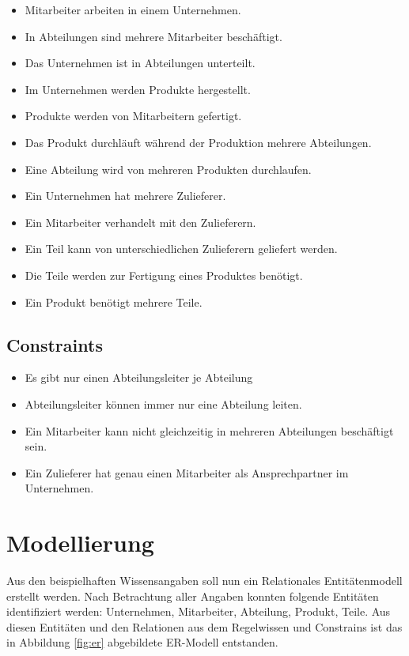 \documentclass[DIV=calc,paper=a4,fontsize=9pt,twocolumn]{scrartcl}
\begin{document}
\begin{itemize}
    \item Mitarbeiter arbeiten in einem Unternehmen.
    \item In Abteilungen sind mehrere Mitarbeiter beschäftigt.
    \item Das Unternehmen ist in Abteilungen unterteilt.
    \item Im Unternehmen werden Produkte hergestellt.
    \item Produkte werden von Mitarbeitern gefertigt.
    \item Das Produkt durchläuft während der Produktion mehrere Abteilungen.
    \item Eine Abteilung wird von mehreren Produkten durchlaufen.
    \item Ein Unternehmen hat mehrere Zulieferer.
    \item Ein Mitarbeiter verhandelt mit den Zulieferern.
    \item Ein Teil kann von unterschiedlichen Zulieferern geliefert werden.
    \item Die Teile werden zur Fertigung eines Produktes benötigt.
    \item Ein Produkt benötigt mehrere Teile.
\end{itemize}


\subsection{Constraints}

\begin{itemize}
\item Es gibt nur einen Abteilungsleiter je Abteilung
\item Abteilungsleiter können immer nur eine Abteilung leiten.
\item Ein Mitarbeiter kann nicht gleichzeitig in mehreren Abteilungen beschäftigt sein.
\item Ein Zulieferer hat genau einen Mitarbeiter als Ansprechpartner im Unternehmen.
\end{itemize}

\section{Modellierung}

Aus den beispielhaften Wissensangaben soll nun ein Relationales Entitätenmodell erstellt werden. Nach Betrachtung aller Angaben konnten folgende Entitäten identifiziert werden: Unternehmen, Mitarbeiter, Abteilung, Produkt, Teile. Aus diesen Entitäten und den Relationen aus dem Regelwissen und Constrains ist das in Abbildung \ref{fig:er} abgebildete ER-Modell entstanden.
\end{document}
